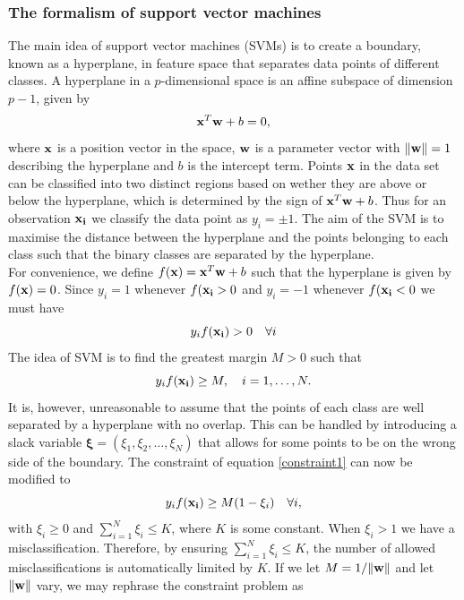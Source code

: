 \documentclass[notitlepage, reprint, nofootinbib]{revtex4-1}
\begin{document}
\subsubsection{The formalism of support vector machines}
The main idea of support vector machines (SVMs) is to create a boundary, known as a hyperplane, in feature space that separates data points of different classes. A hyperplane in a $p$-dimensional space is an affine subspace of dimension $p-1$, given by 
\begin{equation}\vb{x}^T\vb{w}+b=0,\end{equation} 
where $\vb{x}$ is a position vector in the space, $\vb{w}$ is a parameter vector with $\norm{\vb{w}}=1$ describing the hyperplane and $b$ is the intercept term. Points $\vb{x}$ in the data set can be classified into two distinct regions based on wether they are above or below the hyperplane, which is determined by the sign of $\vb{x}^T\vb{w}+b$. Thus for an observation $\vb{x_i}$ we classify the data point as $y_i=\pm1$. The aim of the SVM is to maximise the distance between the hyperplane and the points belonging to each class such that the binary classes are separated by the hyperplane. \\[2mm]
For convenience, we define $f(\vb{x}) = \vb{x}^T\vb{w}+b$ such that the hyperplane is given by $f(\vb{x})=0$. Since $y_i=1$ whenever $f(\vb{x_i}>0$ and $y_i=-1$ whenever $f(\vb{x_i}<0$ we must have 
\begin{equation}y_i f(\vb{x_i})>0\quad \forall i\end{equation}
The idea of SVM is to find the greatest margin $M>0$ such that 
\begin{equation}\label{constraint1} y_if(\vb{x_i})\geq M, \quad i=1,\dots, N.\end{equation}
It is, however, unreasonable to assume that the points of each class are well separated by a hyperplane with no overlap. This can be handled by introducing a slack variable $\boldsymbol{\xi}=(\xi_1, \xi_2, \dots, \xi_N)$ that allows for some points to be on the wrong side of the boundary. The constraint of equation \ref{constraint1} can now be modified to 
\begin{equation} y_if(\vb{x_i})\geq M(1-\xi_i)\quad \forall i,\end{equation}
with $\xi_i\geq0$ and $\sum_{i=1}^{N}\xi_i\leq K$, where $K$ is some constant. When $\xi_i > 1$ we have a misclassification. Therefore, by ensuring $\sum_{i=1}^{N}\xi_i\leq K$, the number of allowed misclassifications is automatically limited by $K$. If we let $M=1/\norm{\vb{w}}$ and let $\norm{\vb{w}}$ vary, we may rephrase the constraint problem as 
\end{document}
